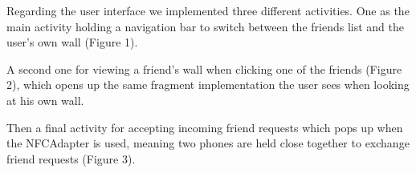 \documentclass{report}
\begin{document}
Regarding the user interface we implemented three different activities. One as the main activity holding a navigation bar to switch between the friends list and the user's own wall (Figure 1).
\begin{figure}[H]
	\centering
	\hfill
	\hfill
	
\end{figure}

 A second one for viewing a friend's wall when clicking one of the friends (Figure 2), which opens up the same fragment implementation the user sees when looking at his own wall.\newline
 

Then a final activity for accepting incoming friend requests which pops up when the NFCAdapter is used, meaning two phones are held close together to exchange friend requests (Figure 3).
\end{document}
